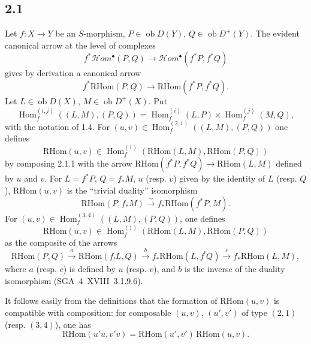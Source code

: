 \documentclass[11pt]{article}
\DeclareMathOperator{\Hom}{Hom}
\newcommand{\ob}{\operatorname{ob}}
\providecommand{\RHom}{\mathrm{RHom}}
\providecommand{\RHom}{\mathrm{RHom}}
\providecommand{\Hom}{\operatorname{Hom}}
\providecommand{\ob}{\operatorname{ob}}
\providecommand{\RHom}{\mathrm R\mathcal{H}om}
\providecommand{\RHom}{\mathrm{RHom}}
\begin{document}
\subsection*{2.1}
Let $f:X\to Y$ be an $S$-morphism, $P\in\ob D(Y)$, $Q\in\ob D^{+}(Y)$. The evident canonical arrow at the level of complexes
\[
f^{*}\mathcal Hom^{\bullet}(P,Q)\longrightarrow\mathcal Hom^{\bullet}(f^{*}P,f^{*}Q)
\]
gives by derivation a canonical arrow
\begin{equation}\tag{2.1.1}
f^{*}\RHom(P,Q)\longrightarrow\RHom(f^{*}P,f^{*}Q).
\end{equation}
Let $L\in\ob D(X)$, $M\in\ob D^{+}(X)$. Put
\begin{equation}\tag{2.1.2}
\Hom_f^{(i,j)}((L,M),(P,Q))=\Hom_f^{(i)}(L,P)\times\Hom_f^{(j)}(M,Q),
\end{equation}
with the notation of 1.4. For $(u,v)\in\Hom_f^{(2,1)}((L,M),(P,Q))$ one defines
\begin{equation}\tag{2.1.3}
\RHom(u,v)\in\Hom_f^{(1)}(\RHom(L,M),\RHom(P,Q))
\end{equation}
by composing 2.1.1 with the arrow $\RHom(f^{*}P,f^{*}Q)\to\RHom(L,M)$ defined by $u$ and $v$. For $L=f^{*}P$, $Q=f_{*}M$, $u$ (resp. $v$) given by the identity of $L$ (resp. $Q$), $\RHom(u,v)$ is the ``trivial duality'' isomorphism
\begin{equation}\tag{2.1.4}
\RHom(P,f_{*}M)\xrightarrow{\sim}f_{*}\RHom(f^{*}P,M).
\end{equation}
For $(u,v)\in\Hom_f^{(3,4)}((L,M),(P,Q))$, one defines
\begin{equation}\tag{2.1.5}
\RHom(u,v)\in\Hom_f^{(1)}(\RHom(L,M),\RHom(P,Q))
\end{equation}
as the composite of the arrows
\[
\RHom(P,Q)\xrightarrow{a}\RHom(f_{!}L,Q)\xrightarrow{b}f_{*}\RHom(L,f^{!}Q)\xrightarrow{c}f_{*}\RHom(L,M),
\]
where $a$ (resp. $c$) is defined by $u$ (resp. $v$), and $b$ is the inverse of the duality isomorphism (SGA~4~XVIII~3.1.9.6).

It follows easily from the definitions that the formation of $\RHom(u,v)$ is compatible with composition: for composable $(u,v)$, $(u',v')$ of type $(2,1)$ (resp. $(3,4)$), one has
\begin{equation}\tag{2.1.6}
\RHom(u'u,v'v)=\RHom(u',v')\,\RHom(u,v).
\end{equation}
\end{document}
